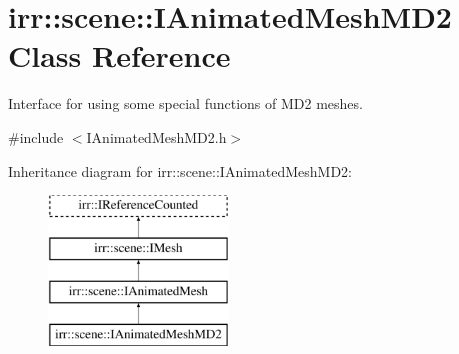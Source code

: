 \hypertarget{classirr_1_1scene_1_1IAnimatedMeshMD2}{}\section{irr\+:\+:scene\+:\+:I\+Animated\+Mesh\+M\+D2 Class Reference}
\label{classirr_1_1scene_1_1IAnimatedMeshMD2}


Interface for using some special functions of M\+D2 meshes.  




{\ttfamily \#include $<$I\+Animated\+Mesh\+M\+D2.\+h$>$}

Inheritance diagram for irr\+:\+:scene\+:\+:I\+Animated\+Mesh\+M\+D2\+:\begin{figure}[H]
\begin{center}
\leavevmode
\includegraphics[height=4.000000cm]{classirr_1_1scene_1_1IAnimatedMeshMD2}
\end{center}
\end{figure}
